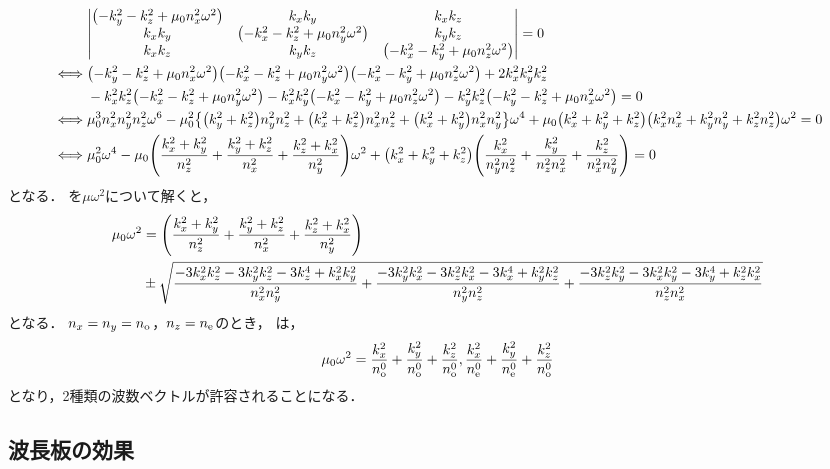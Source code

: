 \documentclass{report}
\begin{document}
    \begin{align}
      &\mqty|
        \qty(-k^2_y - k^2_z + \mu_0n^2_x\omega^2) & k_xk_y & k_xk_z \\ 
        k_xk_y & \qty(-k^2_x - k^2_z + \mu_0n^2_y\omega^2) & k_yk_z \\ 
        k_xk_z &  k_yk_z & \qty(-k^2_x - k^2_y + \mu_0n^2_z\omega^2) \\ 
      | = 0 \\ 
      \iff &\qty(-k^2_y - k^2_z + \mu_0n^2_x\omega^2)\qty(-k^2_x - k^2_z + \mu_0n^2_y\omega^2)\qty(-k^2_x - k^2_y + \mu_0n^2_z\omega^2) + 2k^2_xk^2_yk^2_z \notag \\
      &- k^2_xk^2_z\qty(-k^2_x - k^2_z + \mu_0n^2_y\omega^2) - k^2_xk^2_y\qty(-k^2_x - k^2_y + \mu_0n^2_z\omega^2) - k^2_yk^2_z\qty(-k^2_y - k^2_z + \mu_0n^2_x\omega^2) = 0 \\ 
      \iff &\mu^3_0n^2_xn^2_yn^2_z\omega^6 - \mu^2_0\qty{\qty(k^2_y + k^2_z)n^2_yn^2_z + \qty(k^2_x + k^2_z)n^2_xn^2_z +\qty(k^2_x + k^2_y)n^2_xn^2_y}\omega^4 + \mu_0\qty(k^2_x + k^2_y + k^2_z)\qty(k^2_xn^2_x + k^2_yn^2_y + k^2_zn^2_z)\omega^2 = 0 \\ 
      \iff &\mu^2_0\omega^4 - \mu_0\qty(\frac{k^2_x + k^2_y}{n^2_z} + \frac{k^2_y + k^2_z}{n^2_x} + \frac{k^2_z + k^2_x}{n^2_y})\omega^2 + \qty(k^2_x + k^2_y + k^2_z)\qty(\frac{k^2_x}{n^2_yn^2_z} + \frac{k^2_y}{n^2_zn^2_x} + \frac{k^2_z}{n^2_xn^2_y}) = 0 \label{o-e-eq}
    \end{align}
    となる．
    を$\mu\omega^2$について解くと，
    \begin{align}
      \mu_0\omega^2 &= \qty(\frac{k^2_x + k^2_y}{n^2_z} + \frac{k^2_y + k^2_z}{n^2_x} + \frac{k^2_z + k^2_x}{n^2_y}) \notag\\
      &\pm \sqrt{\frac{-3k^2_xk^2_z - 3k^2_yk^2_z - 3k^4_z + k^2_xk^2_y}{n^2_xn^2_y} + \frac{-3k^2_yk^2_x - 3k^2_zk^2_x - 3k^4_x + k^2_yk^2_z}{n^2_yn^2_z} + \frac{-3k^2_zk^2_y - 3k^2_xk^2_y - 3k^4_y + k^2_zk^2_x}{n^2_zn^2_x}} \label{mu-omega-solution}
    \end{align}
    となる．
    $n_x = n_y = n_{\mathrm{o}}$，$n_z = n_{\mathrm{e}}$のとき，
    は，%
    \begin{align}
      \mu_0\omega^2 = \frac{k^2_x}{n^0_{\mathrm{o}}} + \frac{k^2_y}{n^0_{\mathrm{o}}} + \frac{k^2_z}{n^0_{\mathrm{o}}}, \frac{k^2_x}{n^0_{\mathrm{e}}} + \frac{k^2_y}{n^0_{\mathrm{e}}} + \frac{k^2_z}{n^0_{\mathrm{o}}}
    \end{align}
    となり，2種類の波数ベクトルが許容されることになる．
  \subsection{波長板の効果}
\end{document}
